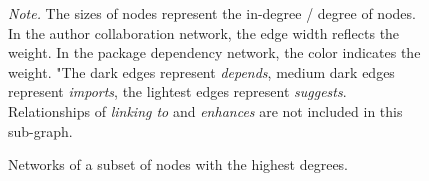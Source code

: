 \begin{figure}
\begin{center}

%
\quad
{}%
\caption{Networks of a subset of nodes with the highest degrees.}
\end{center}

{\small
\textit{Note.} The sizes of nodes represent the in-degree / degree of nodes. In the author collaboration network, the edge width reflects the weight. In the package dependency network, the color indicates the weight. "The dark edges represent {\it depends}, medium dark edges represent {\it imports}, the lightest edges represent {\it suggests}. Relationships of {\it linking to} and {\it enhances} are not included in this sub-graph.
}

\end{figure}





